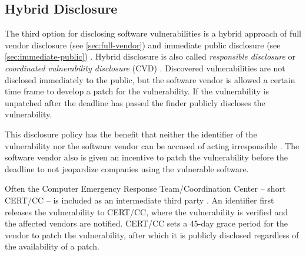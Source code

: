 \subsection{Hybrid Disclosure}
\label{sec:hybrid}

The third option for disclosing software vulnerabilities is a hybrid approach of 
full vendor disclosure (see \autoref{sec:full-vendor}) and immediate public 
disclosure (see \autoref{sec:immediate-public}) \cite{Cavusoglu2007}.
Hybrid disclosure is also called \textit{responsible disclosure} 
\cite{Cavusoglu2007} or \textit{coordinated vulnerability disclosure} (CVD) 
\cite{CertGuideCVD}.
Discovered vulnerabilities are not disclosed immediately to the public, but the
software vendor is allowed a certain time frame to develop a patch for the 
vulnerability.
If the vulnerability is unpatched after the deadline has passed the finder publicly discloses the vulnerability.

This disclosure policy has the benefit that neither the identifier of the
vulnerability nor the software vendor can be accused of acting irresponsible
\cite{Cavusoglu2007}.
The software vendor also is given an incentive to patch the vulnerability before
the deadline to not jeopardize companies using the vulnerable software.

Often the Computer Emergency Response Team/Coordination Center -- short CERT/CC -- is
included as an intermediate third party \cite{Cavusoglu2007}.
An identifier first releases the vulnerability to CERT/CC, where the 
vulnerability is verified and the affected vendors are notified.
CERT/CC sets a 45-day grace period for the vendor to patch the vulnerability,
after which it is publicly disclosed regardless of the availability of a patch.